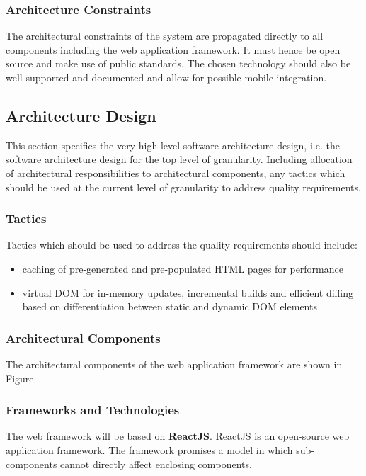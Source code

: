 \subsubsection{Architecture Constraints}
The architectural constraints of the system are propagated directly to all 
components including the web application framework. It must hence be open source
and make use of public standards. The chosen technology should also be well 
supported and documented and allow for possible mobile integration.

\subsection{Architecture Design}
This section specifies the very high-level software architecture design, i.e.
the software architecture design for the top level of granularity. Including 
allocation of architectural responsibilities to architectural components, any
tactics which should be used at the current level of granularity to address
quality requirements.

\subsubsection{Tactics}
Tactics which should be used to address the quality requirements should include:
\begin{itemize}
	\item caching of pre-generated and pre-populated HTML pages for performance
	\item virtual DOM for in-memory updates, incremental builds and efficient 
	diffing based on differentiation between static and dynamic DOM elements
\end{itemize}
\subsubsection{Architectural Components}
The architectural components of the web application framework are shown in Figure

\subsubsection{Frameworks and Technologies}
The web framework will be based on \textbf{ReactJS}. ReactJS is an open-source web
application framework. The framework promises a model in which sub-components
cannot directly affect enclosing components.

